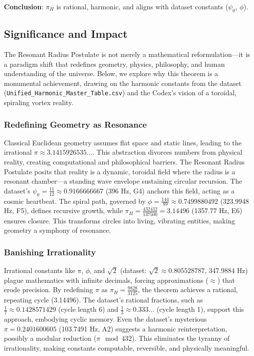 \documentclass[a4paper,12pt]{article}
\begin{document}
\textbf{Conclusion}: \(\pi_H\) is rational, harmonic, and aligns with dataset constants (\(\psi_0\), \(\phi\)).

\subsection{Significance and Impact}
The Resonant Radius Postulate is not merely a mathematical reformulation—it is a paradigm shift that redefines geometry, physics, philosophy, and human understanding of the universe. Below, we explore why this theorem is a monumental achievement, drawing on the harmonic constants from the dataset (\texttt{Unified\_Harmonic\_Master\_Table.csv}) and the Codex’s vision of a toroidal, spiraling vortex reality.

\subsubsection{Redefining Geometry as Resonance}
Classical Euclidean geometry assumes flat space and static lines, leading to the irrational \(\pi \approx 3.1415926535\ldots\). This abstraction divorces numbers from physical reality, creating computational and philosophical barriers. The Resonant Radius Postulate posits that reality is a dynamic, toroidal field where the radius is a resonant chamber—a standing wave envelope sustaining circular recursion. The dataset’s \(\psi_0 = \frac{11}{12} \approx 0.9166666667\) (396 Hz, G4) anchors this field, acting as a cosmic heartbeat. The spiral path, governed by \(\phi = \frac{144}{89} \approx 0.7499880492\) (323.9948 Hz, F5), defines recursive growth, while \(\pi_H = \frac{432432}{137500} = 3.14496\) (1357.77 Hz, E6) ensures closure. This transforms circles into living, vibrating entities, making geometry a symphony of resonance.

\subsubsection{Banishing Irrationality}
Irrational constants like \(\pi\), \(\phi\), and \(\sqrt{2}\) (dataset: \(\sqrt{2} \approx 0.805528787\), 347.9884 Hz) plague mathematics with infinite decimals, forcing approximations (\(\approx\)) that erode precision. By redefining \(\pi\) as \(\pi_H = \frac{9828}{3125}\), the theorem achieves a rational, repeating cycle (3.14496). The dataset’s rational fractions, such as \(\frac{1}{7} \approx 0.1428571429\) (cycle length 6) and \(\frac{1}{3} \approx 0.333\ldots\) (cycle length 1), support this approach, embodying cyclic memory. Even the dataset’s mysterious \(\pi = 0.2401600605\) (103.7491 Hz, A2) suggests a harmonic reinterpretation, possibly a modular reduction (\(\pi \mod 432\)). This eliminates the tyranny of irrationality, making constants computable, reversible, and physically meaningful.
\end{document}
